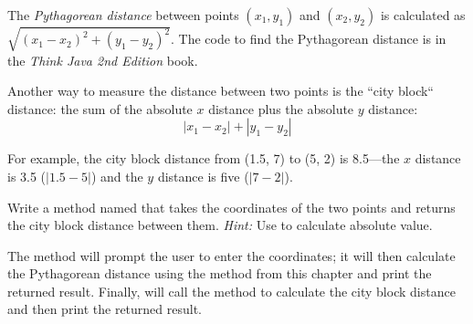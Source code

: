 \begin{exercise}
The {\em Pythagorean distance} between points $(x_1, y_1)$ and $(x_2, y_2)$ is calculated as $\sqrt {(x_1-x_2)^2 + (y_1-y_2)^2}$. The code to find the Pythagorean distance is in the {\em Think Java 2nd Edition} book.

Another way to measure the distance between two points is the ``city block`` distance: the sum of the absolute $x$ distance plus the absolute $y$ distance:
\begin{equation*}
|x_1 - x_2| + |y_1 - y_2|
\end{equation*}

For example, the city block distance from (1.5, 7) to (5, 2) is 8.5---the $x$ distance is 3.5 ($|1.5 - 5|$) and the $y$ distance is five ($|7 - 2|$).

Write a method named  that takes the coordinates of the two points and returns the city block distance between them. {\em Hint:} Use  to calculate absolute value.

The  method will prompt the user to enter the coordinates; it will then calculate the Pythagorean distance using the  method from this chapter and print the returned result. Finally,  will call the  method to calculate the city block distance and then print the returned result.
\end{exercise}

